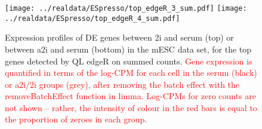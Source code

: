 \documentclass{article}
\newcommand\revised[1]{\textcolor{red}{#1}}
\begin{document}
\begin{figure}[p]
    \begin{center}
        \texttt{[image: ../realdata/ESpresso/top\_edgeR\_3\_sum.pdf]}
        \texttt{[image: ../realdata/ESpresso/top\_edgeR\_4\_sum.pdf]}
    \end{center}
\caption{
    Expression profiles of DE genes between 2i and serum (top) or between a2i and serum (bottom) in the mESC data set, for the top genes detected by QL edgeR on summed counts.
    \revised{Gene expression is quantified in terms of the log-CPM for each cell in the serum (black) or a2i/2i groups (grey), after removing the batch effect with the removeBatchEffect function in limma.
    Log-CPMs for zero counts are not shown -- rather, the intensity of colour in the red bars is equal to the proportion of zeroes in each group.}
}
\label{fig:realdata}
\end{figure}

 
\end{document}
